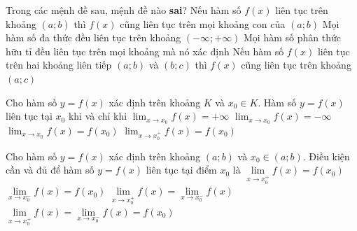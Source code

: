 

\begin{ex}%
	Trong  các mệnh đề sau, mệnh đề nào \textbf{sai}?
	 \choice
		{Nếu hàm số $f(x)$ liên tục trên khoảng $(a;b)$ thì $f(x)$ cũng liên tục trên mọi khoảng con  của $(a;b)$}
		{Mọi hàm số đa thức đều liên  tục trên khoảng $(-\infty;+\infty)$}
		{Mọi hàm số phân thức hữu tỉ đều liên  tục trên mọi khoảng mà nó xác định}
		{\True Nếu hàm số $f(x)$ liên tục trên hai khoảng liên tiếp $(a;b)$  và $(b;c)$ thì $f(x)$ cũng liên tục trên khoảng $(a;c)$}
\end{ex}

\begin{ex}%
	Cho hàm số $y = f\left(x\right)$ xác định trên khoảng $K$ và $x_0 \in K$. Hàm số $y  = f\left(x\right)$ liên tục tại $x_0$ khi và chỉ khi
	\choice 
		{$\displaystyle\lim_{x \rightarrow x_0}  f\left(x\right) = +\infty$}
		{$\displaystyle\lim_{x \rightarrow x_0} f\left(x\right)  = -\infty$}
		{\True $\displaystyle\lim_{x  \rightarrow x_0} f\left(x\right) = f\left(x_0\right)$}
		 {$\displaystyle\lim_{x \rightarrow x_0^{+}} f\left(x\right) = f\left(x_0\right)$}
\end{ex}

\begin{ex}%
	Cho hàm số $y=f(x)$ xác định trên khoảng $(a;b)$ và $x_0 \in (a;b)$. Điều  kiện cần và đủ để hàm số $y=f(x)$ liên tục tại điểm $x_0$ là
	 \choice
		{$\displaystyle\lim\limits_{x \rightarrow x_0^+} f(x)  = f\left(x_0\right)$}
		{$\displaystyle\lim\limits_{x \rightarrow x_0^-} f(x) =  f\left(x_0\right)$}
		{$\displaystyle\lim\limits_{x \rightarrow x_0^+} f(x) = \displaystyle\lim\limits_{x \rightarrow x_0^-} f(x)$} 
		{\True $\displaystyle\lim\limits_{x \rightarrow x_0^+} f(x) = \displaystyle\lim\limits_{x \rightarrow x_0^-}  f(x) = f\left(x_0\right)$}
\end{ex}

